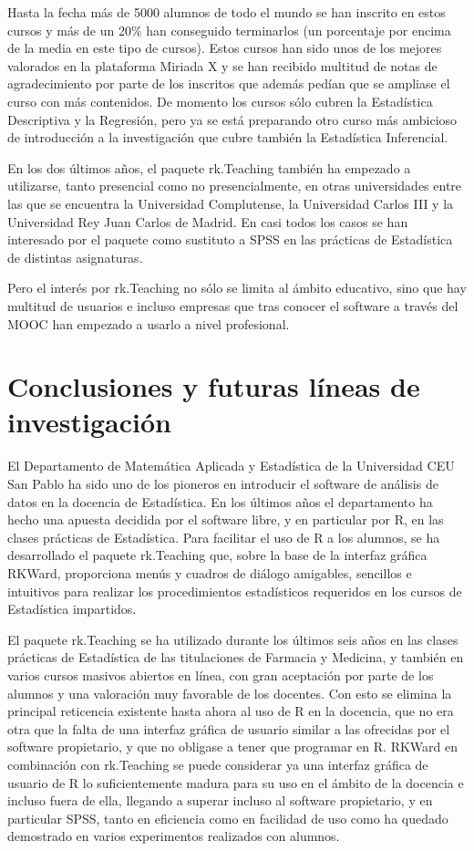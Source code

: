 \documentclass[a4paper,10pt,twoside]{article}
\newcommand{\rkteaching}{\textsf{rk.Teaching}}
\newcommand{\rkward}{\textsf{RKWard}}
\newcommand{\spss}{\textsf{SPSS}}
\begin{document}
Hasta la fecha más de 5000 alumnos de todo el mundo se han inscrito en estos cursos y más de un 20\% han conseguido
terminarlos (un porcentaje por encima de la media en este tipo de cursos).
Estos cursos han sido unos de los mejores valorados en la plataforma Miriada X y se han recibido multitud de notas de
agradecimiento por parte de los inscritos que además pedían que se ampliase el curso con más contenidos. 
De momento los cursos sólo cubren la Estadística Descriptiva y la Regresión, pero ya se está preparando otro curso más
ambicioso de introducción a la investigación que cubre también la Estadística Inferencial. 

En los dos últimos años, el paquete \rkteaching{} también ha empezado a utilizarse, tanto presencial como no
presencialmente, en otras universidades entre las que se encuentra la Universidad Complutense, la Universidad Carlos III
y la Universidad Rey Juan Carlos de Madrid.
En casi todos los casos se han interesado por el paquete como sustituto a \spss{} en las prácticas de Estadística de
distintas asignaturas.

Pero el interés por \rkteaching{} no sólo se limita al ámbito educativo, sino que hay multitud de usuarios e incluso
empresas que tras conocer el software a través del MOOC han empezado a usarlo a nivel profesional. 


\section{Conclusiones y futuras líneas de investigación}
\label{s:conclusiones}
El Departamento de Matemática Aplicada y Estadística de la Universidad CEU San Pablo ha sido uno de los pioneros en
introducir el software de análisis de datos en la docencia de Estadística. 
En los últimos años el departamento ha hecho una apuesta decidida por el software libre, y en particular por R, en las
clases prácticas de Estadística. 
Para facilitar el uso de R a los alumnos, se ha desarrollado el paquete \rkteaching{} que, sobre la base de la interfaz
gráfica \rkward{}, proporciona menús y cuadros de diálogo amigables, sencillos e intuitivos para realizar los
procedimientos estadísticos requeridos en los cursos de Estadística impartidos. 

El paquete \rkteaching{} se ha utilizado durante los últimos seis años en las clases prácticas de Estadística de las
titulaciones de Farmacia y Medicina, y también en varios cursos masivos abiertos en línea, con gran aceptación por parte
de los alumnos y una valoración muy favorable de los docentes.
Con esto se elimina la principal reticencia existente hasta ahora al uso de R en la docencia, que no era otra que la
falta de una interfaz gráfica de usuario similar a las ofrecidas por el software propietario, y que no obligase a tener
que programar en R.
\rkward{} en combinación con \rkteaching{} se puede considerar ya una interfaz gráfica de usuario de R lo
suficientemente madura para su uso en el ámbito de la docencia e incluso fuera de ella, llegando a superar incluso al
software propietario, y en particular \spss{}, tanto en eficiencia como en facilidad de uso como ha quedado
demostrado en varios experimentos realizados con alumnos. 
\end{document}
